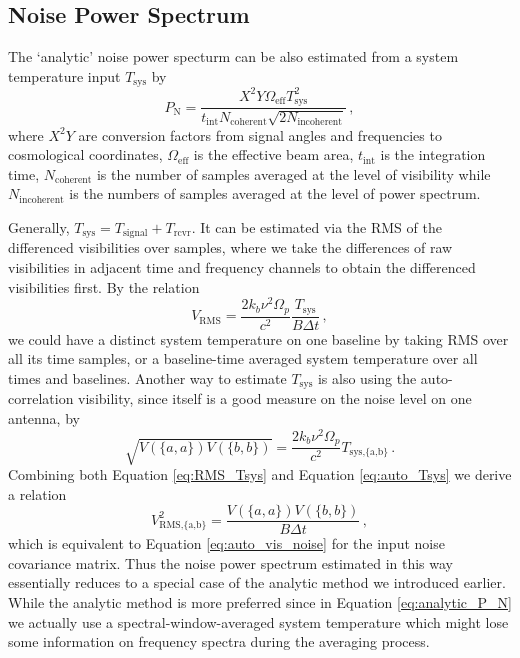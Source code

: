 \documentclass[12pt,a4paper]{article}
\begin{document}
\subsection{Noise Power Spectrum}
The `analytic' noise power specturm can be also estimated from a system temperature input $T_\text{sys}$ by  \citep{cheng2018characterizing,kern2020mitigating}
\begin{equation}
\label{eq:analytic_P_N}
    P_\text{N} = \frac{X^2 Y \Omega_\text{eff} T_\text{sys}^2}{t_\text{int} N_\text{coherent}\sqrt{2N_\text{incoherent}}}\,,
\end{equation}
where $X^2Y$ are conversion factors from signal angles and frequencies to cosmological coordinates, $\Omega_\text{eff}$ is the effective beam area, $t_\text{int}$ is the integration time, $N_\text{coherent}$ is the number of samples averaged at the level of visibility while $N_\text{incoherent}$ is the numbers of samples averaged at the level of power spectrum.

Generally, $T_\text{sys} = T_\text{signal} + T_\text{rcvr}$. It can be estimated via the RMS of the differenced visibilities over samples, where we take the differences of raw visibilities in adjacent time and frequency channels to obtain the differenced visibilities first. By the relation  
\begin{equation}
\label{eq:RMS_Tsys}
V_\text{RMS} = \frac{2k_b \nu^2 \Omega_p}{c^2}\frac{T_\text{sys}}{B \Delta t} \,,
\end{equation}
we could have a distinct system temperature on one baseline by taking RMS over all its time samples, or a baseline-time averaged system temperature over all times and baselines. Another way to estimate $T_\text{sys}$ is also using the auto-correlation visibility, since itself is a good measure on the noise level on one antenna, by
\begin{equation}
\label{eq:auto_Tsys}
\sqrt{V(\{a,a\}) V(\{b,b\})} = \frac{2k_b \nu^2 \Omega_p}{c^2} T_\text{sys,\{a,b\}}\,.
\end{equation}
Combining both Equation \ref{eq:RMS_Tsys} and Equation \ref{eq:auto_Tsys} we derive a relation
\begin{equation}
\label{eq:auto2RMS}
V^2_\text{RMS,\{a,b\}} = \frac{V(\{a,a\}) V(\{b,b\})}{B \Delta t}\,,
\end{equation}
which is equivalent to Equation \ref{eq:auto_vis_noise} for the input noise covariance matrix. Thus the noise power spectrum estimated in this way essentially reduces to a special case of the analytic method we introduced earlier. While the analytic method is more preferred since in Equation \ref{eq:analytic_P_N} we actually use a spectral-window-averaged system temperature which might lose some information on frequency spectra during the averaging process.   

 
\end{document}
